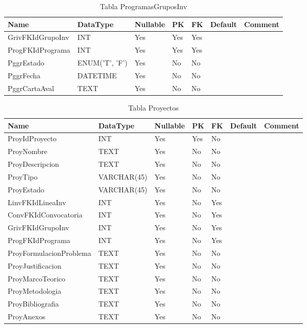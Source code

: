 \begin{table}
	\caption{Tabla ProgramasGruposInv}
	\label{labelTableProgramasGruposInv}
	\begin{tabular}{ |l|l|l|l|l|l|l| }
		\hline
		Name & DataType & Nullable & PK & FK & Default & Comment \\ \hline
		GrivFKIdGrupoInv & INT & Yes & Yes & Yes &  & \\ \hline 
		ProgFKIdPrograma & INT & Yes & Yes & Yes &  & \\ \hline 
		PggrEstado & ENUM('T', 'F') & Yes & No & No &  & \\ \hline 
		PggrFecha & DATETIME & Yes & No & No &  & \\ \hline 
		PggrCartaAval & TEXT & Yes & No & No &  & \\ \hline 
		
	\end{tabular}
\end{table}


\begin{table}
	\caption{Tabla Proyectos}
	\label{labelTableProyectos}
	\begin{tabular}{ |l|l|l|l|l|l|l| }
		\hline
		Name & DataType & Nullable & PK & FK & Default & Comment \\ \hline
		ProyIdProyecto & INT & Yes & Yes & No &  & \\ \hline 
		ProyNombre & TEXT & Yes & No & No &  & \\ \hline 
		ProyDescripcion & TEXT & Yes & No & No &  & \\ \hline 
		ProyTipo & VARCHAR(45) & Yes & No & No &  & \\ \hline 
		ProyEstado & VARCHAR(45) & Yes & No & No &  & \\ \hline 
		LinvFKIdLineaInv & INT & Yes & No & Yes &  & \\ \hline 
		ConvFKIdConvocatoria & INT & Yes & No & Yes &  & \\ \hline 
		GrivFKIdGrupoInv & INT & Yes & No & Yes &  & \\ \hline 
		ProgFKIdPrograma & INT & Yes & No & Yes &  & \\ \hline 
		ProyFormulacionProblema & TEXT & Yes & No & No &  & \\ \hline 
		ProyJustificacion & TEXT & Yes & No & No &  & \\ \hline 
		ProyMarcoTeorico & TEXT & Yes & No & No &  & \\ \hline 
		ProyMetodologia & TEXT & Yes & No & No &  & \\ \hline 
		ProyBibliografia & TEXT & Yes & No & No &  & \\ \hline 
		ProyAnexos & TEXT & Yes & No & No &  & \\ \hline 
		
	\end{tabular}
\end{table}


